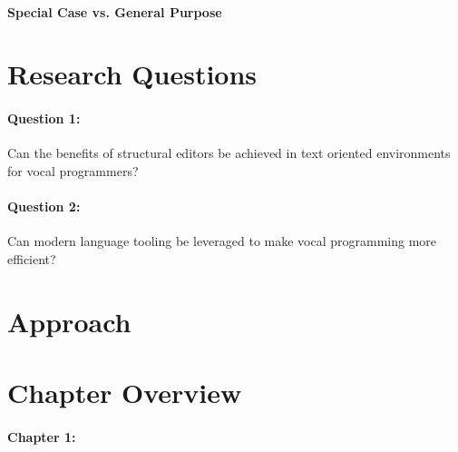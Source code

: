 \documentclass[../thesis.tex]{subfiles}
\begin{document}
\paragraph{Special Case vs. General Purpose}\label{scgp}

\section{Research Questions}
\paragraph{Question 1:}
Can the benefits of structural editors be achieved in text oriented environments for vocal programmers?
\paragraph{Question 2:}
Can modern language tooling be leveraged to make vocal programming more efficient?

\section{Approach}

\section{Chapter Overview}
\paragraph{Chapter 1:}  
\end{document}
